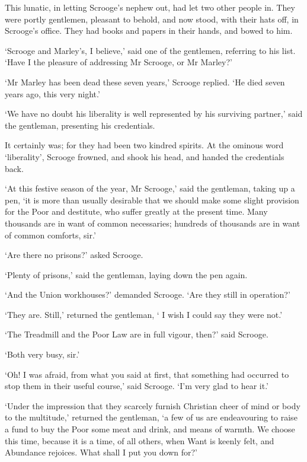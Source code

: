 \documentclass[11pt,twoside]{article}\makeatletter
\begin{document}
This lunatic, in letting Scrooge's nephew out, had let two other people in.  They were portly gentlemen, pleasant to behold, and now stood, with their hats off, in Scrooge's office. They had books and papers in their hands, and bowed to him.  \par
‘Scrooge and Marley's, I believe,’ said one of the  gentlemen, referring to his list.  ‘Have I the pleasure of addressing Mr Scrooge, or Mr Marley?’  \par
‘Mr Marley has been dead these seven years,’ Scrooge replied. ‘He died seven years ago, this very night.’  \par
‘We have no doubt his liberality is well represented by his surviving partner,’ said the gentleman, presenting his credentials.  \par
It certainly was; for they had been two kindred spirits. At the ominous word ‘liberality’, Scrooge frowned, and shook his head, and handed the credentials back.  \par
‘At this festive season of the year, Mr Scrooge,’ said the gentleman, taking up a pen, ‘it is more than usually desirable that we should make some slight provision for the Poor and destitute, who suffer greatly at the present time.  Many thousands are in want of common necessaries; hundreds of thousands are in want of common comforts, sir.’  \par
‘Are there no prisons?’ asked Scrooge.  \par
‘Plenty of prisons,’ said the gentleman, laying down the pen again.   \par
‘And the Union workhouses?’ demanded Scrooge.  ‘Are they still in operation?’  \par
‘They are.  Still,’ returned the gentleman, ‘ I wish I could say they were not.’  \par
‘The Treadmill and the Poor Law are in full vigour, then?’ said Scrooge.  \par
           ‘Both very busy, sir.’         \par
‘Oh!  I was afraid, from what you said at first, that something had occurred to stop them in their useful course,’ said Scrooge.  ‘I'm very glad to hear it.’  \par
‘Under the impression that they scarcely furnish Christian cheer of mind or body to the multitude,’ returned the gentleman, ‘a few of us are endeavouring to raise a fund to buy the Poor some meat and drink, and means of warmth. We choose this time, because it is a time, of all others, when Want is keenly felt, and Abundance rejoices.  What shall I put you down for?’  \par
\end{document}
